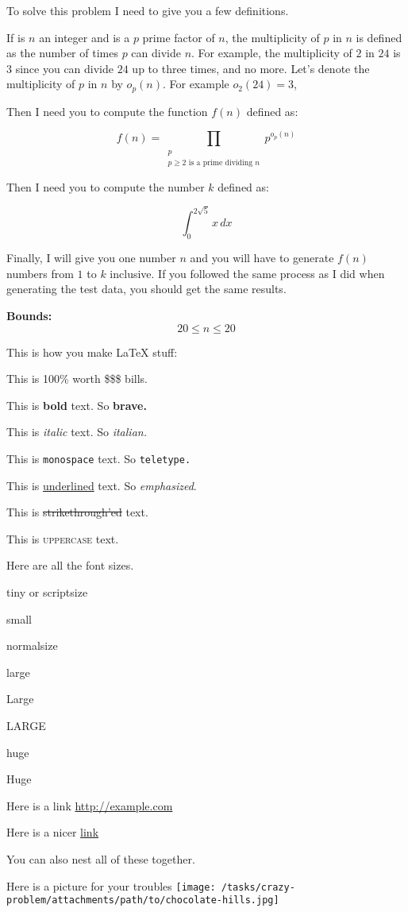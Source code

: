 To solve this problem I need to give you a few definitions.

If is \(n\) an integer and is a \(p\) prime factor of \(n\), the multiplicity of \(p\) in \(n\) is defined as the number of times \(p\) can divide \(n\). For example, the multiplicity of $2$ in $24$ is $3$ since you can divide $24$ up to three times, and no more. Let's denote the multiplicity of $p$ in $n$ by $o_p(n)$. For example \(o_2(24) = 3\), 

Then I need you to compute the function $f(n)$ defined as:

$$f(n) = \prod_{\substack{p \\ p \geq 2 \text{ is a prime dividing } n}} p^{o_p(n)}$$

Then I need you to compute the number $k$ defined as:

\[\int_{0}^{2\sqrt{5}} x \, dx\]

Finally, I will give you one number $n$ and you will have to generate $f(n)$ numbers from $1$ to $k$ inclusive. If you followed the same process as I did when generating the test data, you should get the same results.

\large{\bf{Bounds:}}
$$ 20 \le n \le 20 $$

This is how you make LaTeX stuff:

This is 100\% worth \$\$\$ bills.

This is \textbf{bold} text. So \bf{brave}.

This is \textit{italic} text. So \it{italian}.

This is \texttt{monospace} text. So \tt{teletype}.

This is \underline{underlined} text. So \emph{emphasized}.

This is \sout{strikethrough'ed} text.

This is \textsc{uppercase} text.

Here are all the font sizes.

\tiny{tiny} or \scriptsize{scriptsize}

\small{small}

\normalsize{normalsize}

\large{large}

\Large{Large}

\LARGE{LARGE}

\huge{huge}

\Huge{Huge}


Here is a link \url{http://example.com}

Here is a nicer \href{http://example.com}{link}

You can also nest all of these together. \href{http://example.com}{}

Here is a picture for your troubles \texttt{[image: /tasks/crazy-problem/attachments/path/to/chocolate-hills.jpg]}
